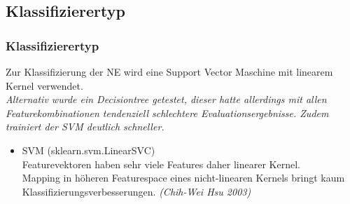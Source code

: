 \documentclass{beamer}
\begin{document}
	\subsection{Klassifizierertyp}
	\begin{frame}
		\frametitle{Klassifizierertyp}
		Zur Klassifizierung der NE wird eine Support Vector Maschine mit linearem Kernel verwendet.\\
		
		\textit{Alternativ wurde ein Decisiontree getestet, dieser hatte allerdings mit allen Featurekombinationen tendenziell schlechtere Evaluationsergebnisse. Zudem trainiert der SVM deutlich schneller.}\\
		
		\begin{itemize}
			\item SVM (sklearn.svm.LinearSVC)\\
			
				Featurevektoren haben sehr viele Features
				daher linearer Kernel.\\
				Mapping in höheren Featurespace eines nicht-linearen Kernels bringt kaum Klassifizierungsverbesserungen. \textit{(Chih-Wei Hsu 2003)}\\
		\end{itemize}
	\end{frame}
\end{document}
